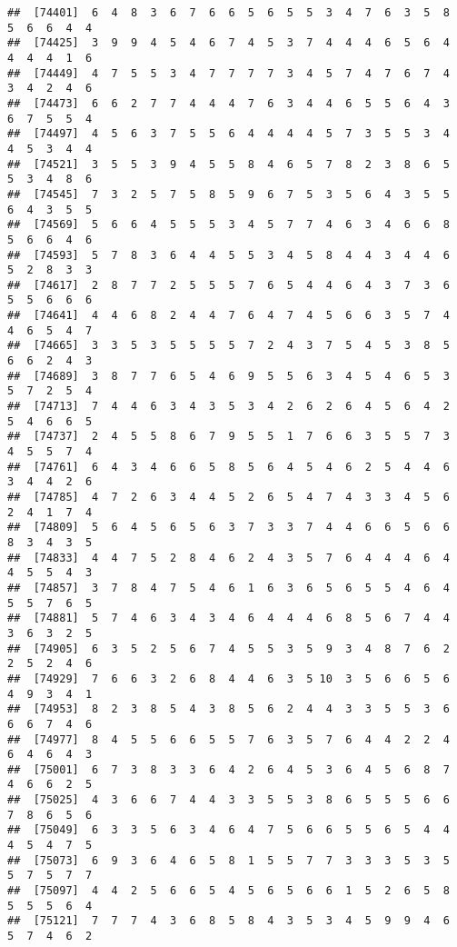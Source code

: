 \documentclass[
]{book}
\begin{document}
\begin{verbatim}
##  [74401]  6  4  8  3  6  7  6  6  5  6  5  5  3  4  7  6  3  5  8  5  6  6  4  4
##  [74425]  3  9  9  4  5  4  6  7  4  5  3  7  4  4  4  6  5  6  4  4  4  4  1  6
##  [74449]  4  7  5  5  3  4  7  7  7  7  3  4  5  7  4  7  6  7  4  3  4  2  4  6
##  [74473]  6  6  2  7  7  4  4  4  7  6  3  4  4  6  5  5  6  4  3  6  7  5  5  4
##  [74497]  4  5  6  3  7  5  5  6  4  4  4  4  5  7  3  5  5  3  4  4  5  3  4  4
##  [74521]  3  5  5  3  9  4  5  5  8  4  6  5  7  8  2  3  8  6  5  5  3  4  8  6
##  [74545]  7  3  2  5  7  5  8  5  9  6  7  5  3  5  6  4  3  5  5  6  4  3  5  5
##  [74569]  5  6  6  4  5  5  5  3  4  5  7  7  4  6  3  4  6  6  8  5  6  6  4  6
##  [74593]  5  7  8  3  6  4  4  5  5  3  4  5  8  4  4  3  4  4  6  5  2  8  3  3
##  [74617]  2  8  7  7  2  5  5  5  7  6  5  4  4  6  4  3  7  3  6  5  5  6  6  6
##  [74641]  4  4  6  8  2  4  4  7  6  4  7  4  5  6  6  3  5  7  4  4  6  5  4  7
##  [74665]  3  3  5  3  5  5  5  5  7  2  4  3  7  5  4  5  3  8  5  6  6  2  4  3
##  [74689]  3  8  7  7  6  5  4  6  9  5  5  6  3  4  5  4  6  5  3  5  7  2  5  4
##  [74713]  7  4  4  6  3  4  3  5  3  4  2  6  2  6  4  5  6  4  2  5  4  6  6  5
##  [74737]  2  4  5  5  8  6  7  9  5  5  1  7  6  6  3  5  5  7  3  4  5  5  7  4
##  [74761]  6  4  3  4  6  6  5  8  5  6  4  5  4  6  2  5  4  4  6  3  4  4  2  6
##  [74785]  4  7  2  6  3  4  4  5  2  6  5  4  7  4  3  3  4  5  6  2  4  1  7  4
##  [74809]  5  6  4  5  6  5  6  3  7  3  3  7  4  4  6  6  5  6  6  8  3  4  3  5
##  [74833]  4  4  7  5  2  8  4  6  2  4  3  5  7  6  4  4  4  6  4  4  5  5  4  3
##  [74857]  3  7  8  4  7  5  4  6  1  6  3  6  5  6  5  5  4  6  4  5  5  7  6  5
##  [74881]  5  7  4  6  3  4  3  4  6  4  4  4  6  8  5  6  7  4  4  3  6  3  2  5
##  [74905]  6  3  5  2  5  6  7  4  5  5  3  5  9  3  4  8  7  6  2  2  5  2  4  6
##  [74929]  7  6  6  3  2  6  8  4  4  6  3  5 10  3  5  6  6  5  6  4  9  3  4  1
##  [74953]  8  2  3  8  5  4  3  8  5  6  2  4  4  3  3  5  5  3  6  6  6  7  4  6
##  [74977]  8  4  5  5  6  6  5  5  7  6  3  5  7  6  4  4  2  2  4  6  4  6  4  3
##  [75001]  6  7  3  8  3  3  6  4  2  6  4  5  3  6  4  5  6  8  7  4  6  6  2  5
##  [75025]  4  3  6  6  7  4  4  3  3  5  5  3  8  6  5  5  5  6  6  7  8  6  5  6
##  [75049]  6  3  3  5  6  3  4  6  4  7  5  6  6  5  5  6  5  4  4  4  5  4  7  5
##  [75073]  6  9  3  6  4  6  5  8  1  5  5  7  7  3  3  3  5  3  5  5  7  5  7  7
##  [75097]  4  4  2  5  6  6  5  4  5  6  5  6  6  1  5  2  6  5  8  5  5  5  6  4
##  [75121]  7  7  7  4  3  6  8  5  8  4  3  5  3  4  5  9  9  4  6  5  7  4  6  2

\end{verbatim}
\end{document}
